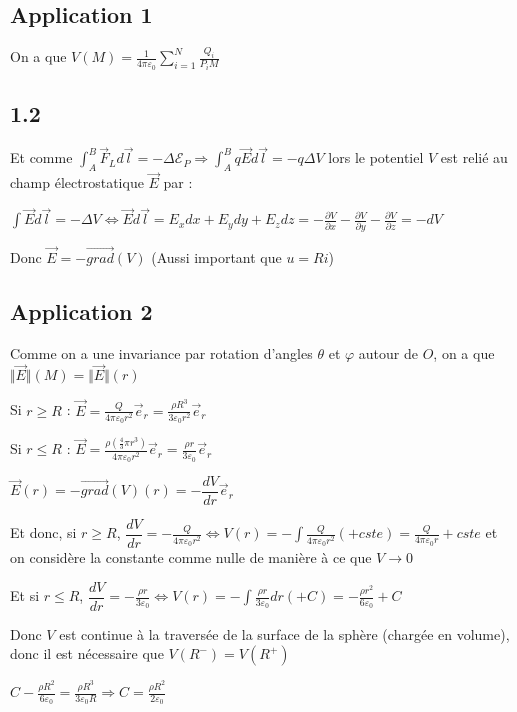 \documentclass[a4paper,12pt]{book}
\begin{document}
\subsection{Application 1}
On a que $V(M)=\frac{1}{4\pi\varepsilon_0}\sum\limits_{i=1}^N \frac{Q_i}{P_iM}$

\subsection{1.2}
Et comme $\int_A^B\vec{F}_Ld\vec{l}=-\Delta\mathcal{E}_P\Rightarrow\int_A^Bq\vec{E}d\vec{l}=-q\Delta V$ lors le potentiel $V$ est relié au champ électrostatique $\vec{E}$ par : \par $\int\vec{E}d\vec{l}=-\Delta V \Leftrightarrow\vec{E}d\vec{l}=E_xdx+E_ydy+E_zdz=-\frac{\partial V}{\partial x} - \frac{\partial V}{\partial y}-\frac{\partial V}{\partial z}=-dV$
\par Donc $\vec{E}=-\vec{grad}(V)$ (Aussi important que $u=Ri$)

\subsection{Application 2}
Comme on a une invariance par rotation d'angles $\theta$ et $\varphi$ autour de $O$, on a que $\Vert\vec{E}\Vert(M)=\Vert\vec{E}\Vert(r)$
\par Si $r\geq R$ : $\vec{E}=\frac{Q}{4\pi\varepsilon_0r^2}\vec{e}_r=\frac{\rho R^3}{3\varepsilon_0r^2}\vec{e}_r$
\par Si $r\leq R$ : $\vec{E}=\frac{\rho(\frac{4}{3}\pi r^3)}{4\pi\varepsilon_0r^2}\vec{e}_r=\frac{\rho r}{3\varepsilon_0}\vec{e}_r$
\par $\vec{E}(r)=-\vec{grad}(V)(r) = -\dfrac{dV}{dr}\vec{e}_r$
\par Et donc, si $r\geq R$, $\dfrac{dV}{dr}=-\frac{Q}{4\pi\varepsilon_0r^2}\Leftrightarrow V(r)=-\int\frac{Q}{4\pi\varepsilon_0r^2}(+cste) = \frac{Q}{4\pi\varepsilon_0r}+cste$ et on considère la constante comme nulle de manière à ce que $V\to 0$
\par Et si $r\leq R$, $\dfrac{dV}{dr}=-\frac{\rho r}{3\varepsilon_0}\Leftrightarrow V(r)=-\int\frac{\rho r}{3\varepsilon_0}dr (+C) = -\frac{\rho r^2}{6\varepsilon_0}+C$
\par Donc $V$ est continue à la traversée de la surface de la sphère (chargée en volume), donc il est nécessaire que $V(R^-)=V(R^+)$
\par $C-\frac{\rho R^2}{6\varepsilon_0}=\frac{\rho R^3}{3\varepsilon_0R}\Rightarrow C=\frac{\rho R^2}{2\varepsilon_0}$ 
\end{document}
